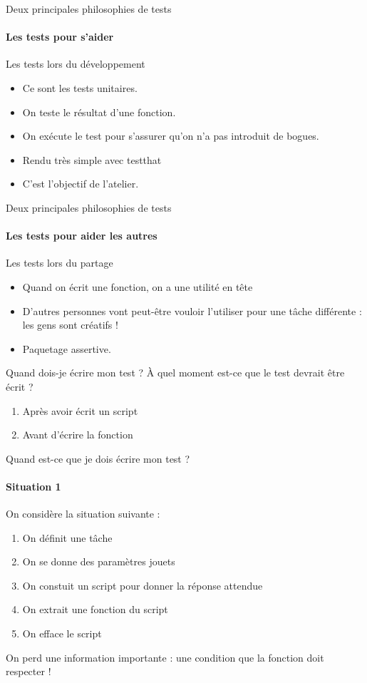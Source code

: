 \documentclass[11pt]{beamer}
\begin{document}
\begin{frame}{Deux principales philosophies de tests}
\framesubtitle{Les tests pour s'aider}
Les tests lors du développement
\begin{itemize}
\item Ce sont les tests unitaires. 
\item On teste le résultat d'une fonction.
\item On exécute le test pour s'assurer qu'on n'a pas introduit de bogues.
\item Rendu très simple avec testthat
\item C'est l'objectif de l'atelier.
\end{itemize}
\end{frame}

\begin{frame}{Deux principales philosophies de tests}
\framesubtitle{Les tests pour aider les autres}
Les tests lors du partage
\begin{itemize}
\item Quand on écrit une fonction, on a une utilité en tête
\item D'autres personnes vont peut-être vouloir l'utiliser pour une tâche différente : les gens sont créatifs !
\item Paquetage assertive. 
\end{itemize}
\end{frame}

\begin{frame}{Quand dois-je écrire mon test ?}
À quel moment est-ce que le test devrait être écrit ?
\begin{enumerate}
\item Après avoir écrit un script
\item Avant d'écrire la fonction
\end{enumerate}
\end{frame}

\begin{frame}{Quand est-ce que je dois écrire mon test ?}
\framesubtitle{Situation 1}
On considère la situation suivante : 
\begin{enumerate}
\item On définit une tâche
\item On se donne des paramètres jouets
\item On constuit un script pour donner la réponse attendue
\item On extrait une fonction du script
\item On efface le script
\end{enumerate}
On perd une information importante : une condition que la fonction doit respecter !
\end{frame}
\end{document}
